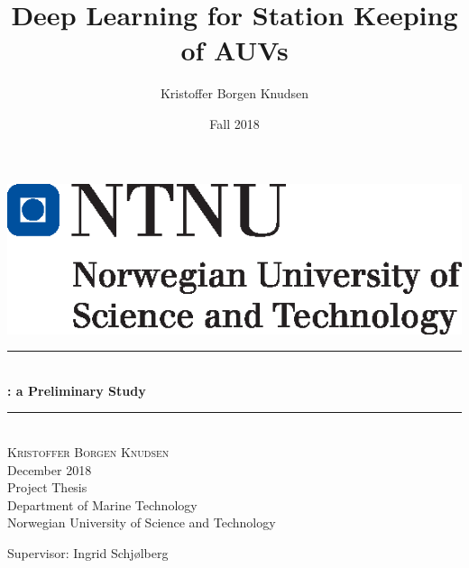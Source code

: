 \documentclass[12pt]{report}
\title{Deep Learning for Station Keeping of AUVs}		%
\author{Kristoffer Borgen Knudsen}								%
\date{Fall 2018}											%
\makeatletter
\let\thetitle\@title
\makeatother
\begin{document}

\begin{titlepage}
    \thispagestyle{empty}
    \includegraphics[left]{logo.eps}	%
    \mbox{}\\[6pc]
	\begin{center}
    \vspace*{0.5 cm}
    
    
    \rule{\linewidth}{0.5 mm} \\[0.4 cm]
	{ \huge \bfseries \thetitle : a Preliminary Study}\\
	\rule{\linewidth}{0.5 mm} \\[1.5 cm]
	
	
	\textsc{\Large Kristoffer Borgen Knudsen}\\[0.5 cm]
	\Large{December 2018}\\[1.5 cm]
	Project Thesis\\
	Department of Marine Technology \\
	Norwegian University of Science and Technology
	
	\end{center}
	
	\vfill
	\noindent Supervisor: Ingrid Schjølberg
	
	
    
    
    
    
	
\end{titlepage}


\newpage

\newpage

\tableofcontents
\pagebreak












\printglossary[type=\acronymtype,title=Acronyms]

\newpage


\newpage
\appendix

\end{document}
